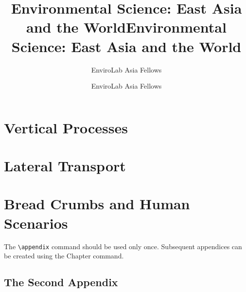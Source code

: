 \documentclass{book}%
\title{Environmental Science: East Asia and the World}
\author{EnviroLab Asia Fellows}
\title{Environmental Science: East Asia and the World}
\author{EnviroLab Asia Fellows}
\begin{document}
\frontmatter

\maketitle
\tableofcontents




\mainmatter
\part{Vertical Processes}















\part{Lateral Transport}








\part{Bread Crumbs and Human Scenarios}






\appendix

The \verb"\appendix" command should be used only once. Subsequent appendices can
be created using the Chapter command.



\chapter{The Second Appendix}
\end{document}
